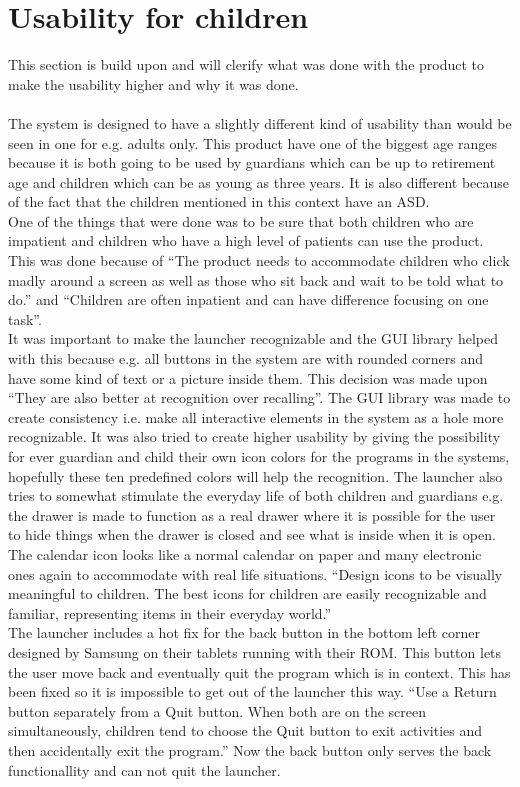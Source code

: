 \section{Usability for children}
This section is build upon \citep{microsoft:usability} and will clerify what was done with the product to make the usability higher and why it was done.\\\\
The \giraf[] system is designed to have a slightly different kind of usability than would be seen in one for e.g. adults only. This product have one of the biggest age ranges because it is both going to be used by guardians which can be up to retirement age and children which can be as young as three years. It is also different because of the fact that the children mentioned in this context have an ASD.\\
One of the things that were done was to be sure that both children who are impatient and children who have a high level of patients can use the product. This was done because of ``The product needs to accommodate children who click madly around a screen as well as those who sit back and wait to be told what to do.'' and ``Children are often inpatient and can have difference focusing on one task''. \\
It was important to make the launcher recognizable and the \giraf[] GUI library helped with this because e.g. all buttons in the \giraf[] system are with rounded corners and have some kind of text or a picture inside them. This decision was made upon ``They are also better at recognition over recalling''. The \giraf[] GUI library was made to create consistency i.e. make all interactive elements in the \giraf[] system as a hole more recognizable. It was also tried to create higher usability by giving the possibility for ever guardian and child their own icon colors for the programs in the \giraf[] systems, hopefully these ten predefined colors will help the recognition. The launcher also tries to somewhat stimulate the everyday life of both children and guardians e.g. the drawer is made to function as a real drawer where it is possible for the user to hide things when the drawer is closed and see what is inside when it is open. The calendar icon looks like a normal calendar on paper and many electronic ones again to accommodate with real life situations. 
``Design icons to be visually meaningful to children. The best icons for children are easily recognizable and familiar, representing items in their everyday world.'' \\
The launcher includes a hot fix for the back button in the bottom left corner designed by Samsung on their tablets running with their ROM. This button lets the user move back and eventually quit the program which is in context. This has been fixed so it is impossible to get out of the launcher this way.
``Use a Return button separately from a Quit button. When both are on the screen simultaneously, children tend to choose the Quit button to exit activities and then accidentally exit the program.'' 
Now the back button only serves the back functionallity and can not quit the launcher.

